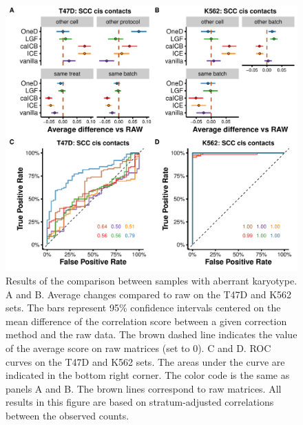 \documentclass[12pt]{report}
\begin{document}
\begin{figure}
\centerline{\includegraphics[width=\textwidth]{img/correlation_aberrant_scc.pdf}}
\caption{
Results of the comparison between samples with aberrant karyotype. A and
B. Average changes compared to raw on the T47D and K562 sets. The bars
represent 95\% confidence intervals centered on the mean difference of the
correlation score between a given correction method and the raw data. The
brown dashed line indicates the value of the average score on raw matrices
(set to 0). C and D. ROC curves on the T47D and K562 sets. The areas under
the curve are indicated in the bottom right corner. The color code is the
same as panels A and B. The brown lines correspond to raw matrices. All
results in this figure are based on stratum-adjusted correlations between the
observed counts.}
\end{figure}
\end{document}
